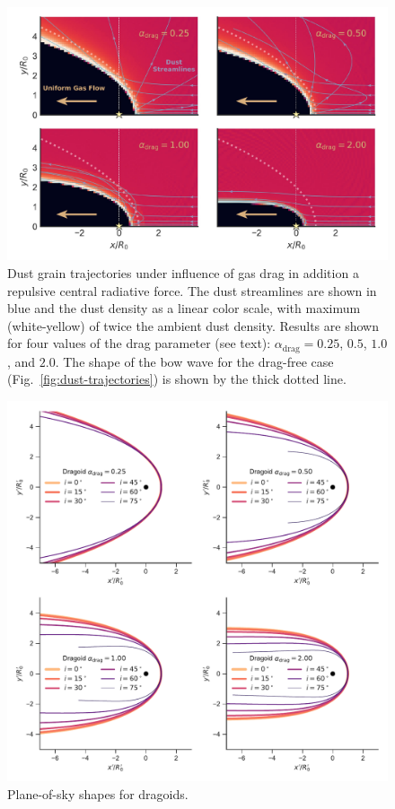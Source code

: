 \begin{figure}
  \centering
  \includegraphics[width=\linewidth]{figs/dust-couple-stream-annotate}
  \caption{Dust grain trajectories under influence of gas drag in
    addition a repulsive central radiative force.  The dust
    streamlines are shown in blue and the dust density as a linear
    color scale, with maximum (white-yellow) of twice the ambient dust
    density.  Results are shown for four values of the drag parameter
    (see text): \(\alpha_\text{drag} = 0.25\), \(0.5\), \(1.0\), and
    \(2.0\). The shape of the bow wave for the drag-free case
    (Fig.~\ref{fig:dust-trajectories}) is shown by the thick dotted
    line.}
  \label{fig:dust-wave-coupling}
\end{figure}


\begin{figure}
  \centering
  \includegraphics[width=\linewidth]{figs/test_xyprime_dragoid}
  \caption{Plane-of-sky shapes for dragoids.}
  \label{fig:dragoid-xy-prime}
\end{figure}


